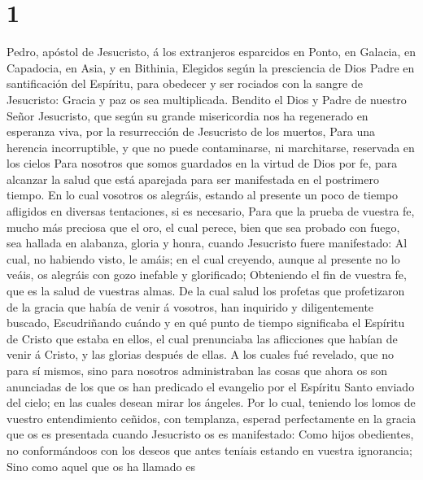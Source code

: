 \hypertarget{section}{%
\section{1}\label{section}}

 Pedro, apóstol de Jesucristo, á los extranjeros
esparcidos en Ponto, en Galacia, en Capadocia, en Asia, y en Bithinia,
 Elegidos según la presciencia de Dios Padre en
santificación del Espíritu, para obedecer y ser rociados con la sangre
de Jesucristo: Gracia y paz os sea multiplicada.  Bendito
el Dios y Padre de nuestro Señor Jesucristo, que según su grande
misericordia nos ha regenerado en esperanza viva, por la resurrección de
Jesucristo de los muertos,  Para una herencia
incorruptible, y que no puede contaminarse, ni marchitarse, reservada en
los cielos  Para nosotros que somos guardados en la virtud
de Dios por fe, para alcanzar la salud que está aparejada para ser
manifestada en el postrimero tiempo.  En lo cual vosotros
os alegráis, estando al presente un poco de tiempo afligidos en diversas
tentaciones, si es necesario,  Para que la prueba de
vuestra fe, mucho más preciosa que el oro, el cual perece, bien que sea
probado con fuego, sea hallada en alabanza, gloria y honra, cuando
Jesucristo fuere manifestado:  Al cual, no habiendo visto,
le amáis; en el cual creyendo, aunque al presente no lo veáis, os
alegráis con gozo inefable y glorificado;  Obteniendo el
fin de vuestra fe, que es la salud de vuestras almas.  De
la cual salud los profetas que profetizaron de la gracia que había de
venir á vosotros, han inquirido y diligentemente buscado,
 Escudriñando cuándo y en qué punto de tiempo significaba
el Espíritu de Cristo que estaba en ellos, el cual prenunciaba las
aflicciones que habían de venir á Cristo, y las glorias después de
ellas.  A los cuales fué revelado, que no para sí mismos,
sino para nosotros administraban las cosas que ahora os son anunciadas
de los que os han predicado el evangelio por el Espíritu Santo enviado
del cielo; en las cuales desean mirar los ángeles.  Por
lo cual, teniendo los lomos de vuestro entendimiento ceñidos, con
templanza, esperad perfectamente en la gracia que os es presentada
cuando Jesucristo os es manifestado:  Como hijos
obedientes, no conformándoos con los deseos que antes teníais estando en
vuestra ignorancia;  Sino como aquel que os ha llamado es
